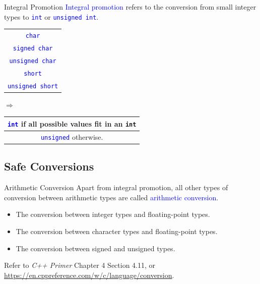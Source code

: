 \documentclass{beamer}
\newcommand{\blue}[1]{\textcolor{blue}{#1}}
\newcommand{\ttt}[1]{\texttt{#1}}
\newcommand{\bluett}[1]{\blue{\ttt{#1}}}
\theoremstyle{definition}
\begin{document}
\begin{frame}{Integral Promotion}
    \blue{Integral promotion} refers to the conversion from small integer types to \bluett{int} or \bluett{unsigned int}.
    \begin{tabular}{|c|}
        \hline
        \bluett{char}\\
        \bluett{signed char}\\
        \bluett{unsigned char}\\
        \bluett{short}\\
        \bluett{unsigned short}\\
        \hline
    \end{tabular}\(\Rightarrow\)\begin{tabular}{|c|}
        \hline
        \bluett{int} if all possible values fit in an \ttt{int}\\
        \hline
        \bluett{unsigned} otherwise.\\
        \hline
    \end{tabular}
\end{frame}

\subsection{Safe Conversions}

\begin{frame}{Arithmetic Conversion}
    Apart from integral promotion, all other types of conversion between arithmetic types are called \blue{arithmetic conversion}.
    \begin{itemize}
        \item The conversion between integer types and floating-point types.
        \item The conversion between character types and floating-point types.
        \item The conversion between signed and unsigned types.
    \end{itemize}
    Refer to \textit{C++ Primer} Chapter 4 Section 4.11, or \url{https://en.cppreference.com/w/c/language/conversion}.
\end{frame}
\end{document}
